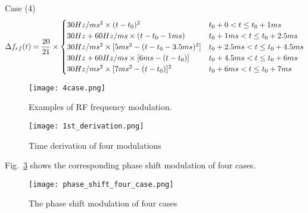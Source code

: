 Case (4) 
\begin{eqnarray}\Delta f_{rf}(t)= \frac{20}{21}\times
\begin{cases}
30Hz/ms^2 \times (t-t_0)^2 &t_0+0<t\le t_0+1ms\cr  
30Hz + 60Hz/ms\times (t-t_0 -1ms) &t_0+1ms<t\le t_0+2.5ms\cr 
30Hz/ms^2 \times [5ms^2-(t-t_0-3.5ms)^2] &t_0+2.5ms<t\le t_0+4.5ms\cr  
30Hz + 60Hz/ms\times [6ms-(t-t_0)] &t_0+4.5ms<t\le t_0+6ms\cr  
30Hz/ms^2 \times [7ms^2-(t-t_0)]^2 &t_0+6ms<t\le t_0+7ms\cr  
\end{cases}
\end{eqnarray}

\begin{figure}[H]
   \centering   
   \texttt{[image: 4case.png]}
   \caption{Examples of RF frequency modulation.}
   \label{4case}
\end{figure}

\begin{figure}[H]
   \centering   
   \texttt{[image: 1st\_derivation.png]}
   \caption{Time derivation of four modulations}
   \label{1st_derivation}
\end{figure}
Fig.~\ref{phase_shift_four_case} shows the corresponding phase shift modulation of four cases. 
\begin{figure}[H]
   \centering   
   \texttt{[image: phase\_shift\_four\_case.png]}
   \caption{The phase shift modulation of four cases}
   \label{phase_shift_four_case}
\end{figure}

